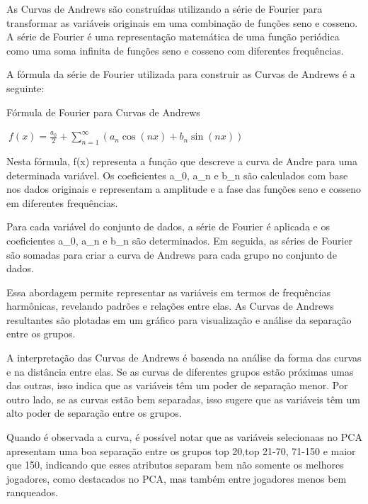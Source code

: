 \documentclass[
]{book}
\begin{document}
As Curvas de Andrews são construídas utilizando a série de Fourier para transformar as variáveis originais em uma combinação de funções seno e cosseno. A série de Fourier é uma representação matemática de uma função periódica como uma soma infinita de funções seno e cosseno com diferentes frequências.

A fórmula da série de Fourier utilizada para construir as Curvas de Andrews é a seguinte:

Fórmula de Fourier para Curvas de Andrews

\(\ f(x) = \frac{a_0}{2} + \sum_{n=1}^{\infty} \left( a_n \cos(nx) + b_n \sin(nx) \right)\)

Nesta fórmula, f(x) representa a função que descreve a curva de Andre para uma determinada variável. Os coeficientes a\_0, a\_n e b\_n são calculados com base nos dados originais e representam a amplitude e a fase das funções seno e cosseno em diferentes frequências.

Para cada variável do conjunto de dados, a série de Fourier é aplicada e os coeficientes a\_0, a\_n e b\_n são determinados. Em seguida, as séries de Fourier são somadas para criar a curva de Andrews para cada grupo no conjunto de dados.

Essa abordagem permite representar as variáveis em termos de frequências harmônicas, revelando padrões e relações entre elas. As Curvas de Andrews resultantes são plotadas em um gráfico para visualização e análise da separação entre os grupos.

A interpretação das Curvas de Andrews é baseada na análise da forma das curvas e na distância entre elas. Se as curvas de diferentes grupos estão próximas umas das outras, isso indica que as variáveis têm um poder de separação menor. Por outro lado, se as curvas estão bem separadas, isso sugere que as variáveis têm um alto poder de separação entre os grupos.

Quando é observada a curva, é possível notar que as variáveis selecionaas no PCA apresentam uma boa separação entre os grupos top 20,top 21-70, 71-150 e maior que 150, indicando que esses atributos separam bem não somente os melhores jogadores, como destacados no PCA, mas também entre jogadores menos bem ranqueados.
\end{document}

